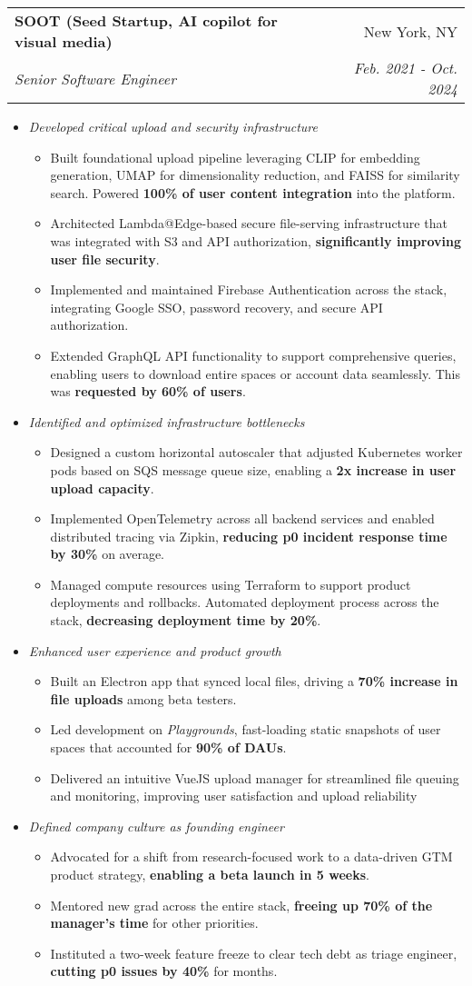 \documentclass[letterpaper,11pt]{article}
\makeatletter
\newcommand{\resumeItemNoTitleTopPadding}[1]{\vspace{0.5pt} \item\small #1 \vspace{-2pt}}
\newcommand{\resumeItemNoTitle}[1]{\item\small #1 \vspace{-2pt}}
\newcommand{\resumeSubheading}[4]{
  \vspace{-1pt}\item
    \begin{tabular*}{0.97\textwidth}[t]{l@{\extracolsep{\fill}}r}
      \textbf{#1} & #2 \\
      \textit{\small#3} & \textit{\small #4} \\
    \end{tabular*}\vspace{-5pt}
}
\newcommand{\resumeItemListStart}{\begin{itemize}[leftmargin=*]}
\newcommand{\resumeListEnd}{\end{itemize}}
\makeatother
\begin{document}
    \resumeSubheading
      {SOOT (Seed Startup, AI copilot for visual media)}{New York, NY}
      {Senior Software Engineer}{Feb. 2021 - Oct. 2024}
      \resumeItemListStart
        \resumeItemNoTitle {\textit{Developed critical upload and security infrastructure}}
        \resumeItemListStart
          \resumeItemNoTitle {Built foundational upload pipeline leveraging CLIP for embedding generation, UMAP for dimensionality reduction, and FAISS for similarity search. Powered \textbf{100\% of user content integration} into the platform.}
          \resumeItemNoTitle {Architected Lambda@Edge-based secure file-serving infrastructure that was integrated with S3 and API authorization, \textbf{significantly improving user file security}.}
          \resumeItemNoTitle {Implemented and maintained Firebase Authentication across the stack, integrating Google SSO, password recovery, and secure API authorization.}
          \resumeItemNoTitle {Extended GraphQL API functionality to support comprehensive queries, enabling users to download entire spaces or account data seamlessly. This was \textbf{requested by 60\% of users}.}
        \end{itemize}
        \resumeItemNoTitleTopPadding {\textit{Identified and optimized infrastructure bottlenecks}}
        \resumeItemListStart
          \resumeItemNoTitle {Designed a custom horizontal autoscaler that adjusted Kubernetes worker pods based on SQS message queue size, enabling a \textbf{2x increase in user upload capacity}.}
          \resumeItemNoTitle {Implemented OpenTelemetry across all backend services and enabled distributed tracing via Zipkin, \textbf{reducing p0 incident response time by 30\%} on average.}
          \resumeItemNoTitle {Managed compute resources using Terraform to support product deployments and rollbacks. Automated deployment process across the stack, \textbf{decreasing deployment time by 20\%}.}
        \end{itemize}
        \resumeItemNoTitleTopPadding {\textit{Enhanced user experience and product growth}}
        \resumeItemListStart
          \resumeItemNoTitle {Built an Electron app that synced local files, driving a \textbf{70\% increase in file uploads} among beta testers.}
          \resumeItemNoTitle {Led development on \textit{Playgrounds}, fast-loading static snapshots of user spaces that accounted for \textbf{90\% of DAUs}.}
          \resumeItemNoTitle {Delivered an intuitive VueJS upload manager for streamlined file queuing and monitoring, improving user satisfaction and upload reliability}
        \end{itemize}
        \resumeItemNoTitleTopPadding {\textit{Defined company culture as founding engineer}}
        \resumeItemListStart
          \resumeItemNoTitle {Advocated for a shift from research-focused work to a data-driven GTM product strategy, \textbf{enabling a beta launch in 5 weeks}.}
          \resumeItemNoTitle {Mentored new grad across the entire stack, \textbf{freeing up 70\% of the manager's time} for other priorities.}
          \resumeItemNoTitle {Instituted a two-week feature freeze to clear tech debt as triage engineer, \textbf{cutting p0 issues by 40\%} for months.}
        \end{itemize}
      \resumeListEnd  
\end{document}
